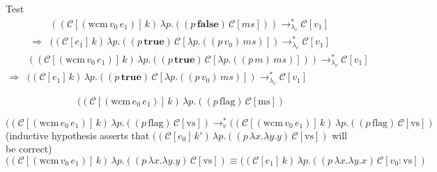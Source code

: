 \documentclass[ms,electronic,twosidetoc,letterpaper,chaptercenter,parttop]{byumsphd}
\begin{document}
\begin{theorem}
Test
\begin{align*}
            &((\mathcal{C}[(\mathrm{wcm}\,v_0\,e_1)]\,k)\,\lambda p.((p\,\mathbf{false})\,\mathcal{C}[\mathit{ms}]))\rightarrow_{\lambda_{v}}^{*}\mathcal{C}[v_1]\\
\Rightarrow &((\mathcal{C}[e_1]\,k)\,\lambda p.((p\,\mathbf{true})\,\mathcal{C}[\lambda p.((p\,v_0)\,\mathit{ms})])\rightarrow_{\lambda_{v}}^{*}\mathcal{C}[v_1]
\end{align*}
\begin{align*}
            &((\mathcal{C}[(\mathrm{wcm}\,v_0\,e_1)]\,k)\,\lambda p.((p\,\mathbf{true})\,\mathcal{C}[\lambda p.((p\,m)\,\mathit{ms})]))\rightarrow_{\lambda_{v}}^{*}\mathcal{C}[v_1]\\
\Rightarrow &((\mathcal{C}[e_1]\,k)\,\lambda p.((p\,\mathbf{true})\,\mathcal{C}[\lambda p.((p\,v_0)\,\mathit{ms})])\rightarrow_{\lambda_{v}}^{*}\mathcal{C}[v_1]
\end{align*}
\end{theorem}

\[
((\mathcal{C}[(\mathrm{wcm}\,e_0\,e_1)]\,k)\,\lambda p.((p\,\mathrm{flag})\,\mathcal{C}[\mathrm{ms}])
\]

\[
((\mathcal{C}[(\mathrm{wcm}\,e_0\,e_1)]\,k)\,\lambda p.((p\,\mathrm{flag})\,\mathcal{C}[\mathrm{vs}])\rightarrow_{v}^{*}((\mathcal{C}[(\mathrm{wcm}\,v_0\,e_1)]\,k)\,\lambda p.((p\,\mathrm{flag})\,\mathcal{C}[\mathrm{vs}])
\]
(inductive hypothesis asserts that $((\mathcal{C}[e_0]\,k')\,\lambda p.((p\,\lambda x.\lambda y.y)\,\mathcal{C}[\mathrm{vs}])$ will be correct)
\[
((\mathcal{C}[(\mathrm{wcm}\,v_0\,e_1)]\,k)\,\lambda p.((p\,\lambda x.\lambda y.y)\,\mathcal{C}[\mathrm{vs}])\equiv((\mathcal{C}[e_1]\,k)\,\lambda p.((p\,\lambda x.\lambda y.x)\,\mathcal{C}[v_0 : \mathrm{vs}])
\]


\end{document}
